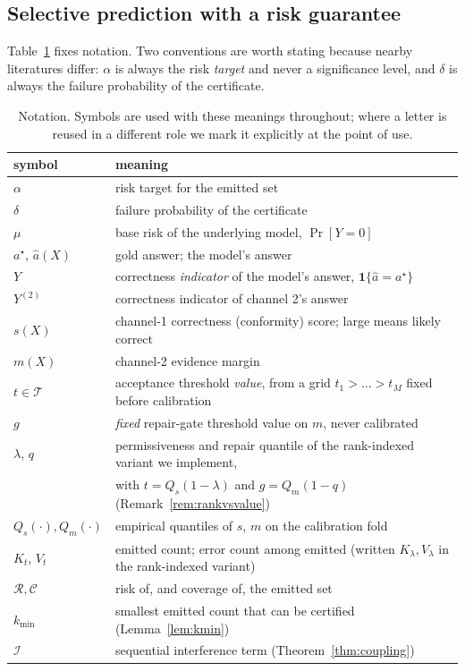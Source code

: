 \documentclass{article}
\theoremstyle{plain}
\theoremstyle{definition}
\theoremstyle{remark}
\newcommand{\Risk}{\mathcal{R}}
\newcommand{\Cov}{\mathcal{C}}
\newcommand{\Iota}{\mathcal{I}}
\begin{document}
\subsection{Selective prediction with a risk guarantee}

Table~\ref{tab:notation} fixes notation. Two conventions are worth stating because nearby
literatures differ: $\alpha$ is always the risk \emph{target} and never a significance
level, and $\delta$ is always the failure probability of the certificate.

\begin{table}[t]
\centering
\caption{Notation. Symbols are used with these meanings throughout; where a letter is
reused in a different role we mark it explicitly at the point of use.}
\label{tab:notation}
\small
\begin{tabular}{ll}
\toprule
symbol & meaning\\
\midrule
$\alpha$ & risk target for the emitted set\\
$\delta$ & failure probability of the certificate\\
$\mu$ & base risk of the underlying model, $\Pr[Y=0]$\\
$a^\star$, $\hat a(X)$ & gold answer; the model's answer\\
$Y$ & correctness \emph{indicator} of the model's answer, $\mathbf{1}\{\hat a=a^\star\}$\\
$Y^{(2)}$ & correctness indicator of channel 2's answer\\
$s(X)$ & channel-1 correctness (conformity) score; large means likely correct\\
$m(X)$ & channel-2 evidence margin\\
$t\in\mathcal{T}$ & acceptance threshold \emph{value}, from a grid $t_1>\dots>t_M$ fixed
before calibration\\
$g$ & \emph{fixed} repair-gate threshold value on $m$, never calibrated\\
$\lambda$, $q$ & permissiveness and repair quantile of the rank-indexed variant we
implement,\\
& with $t=Q_s(1-\lambda)$ and $g=Q_m(1-q)$ (Remark~\ref{rem:rankvsvalue})\\
$Q_s(\cdot),Q_m(\cdot)$ & empirical quantiles of $s$, $m$ on the calibration fold\\
$K_t$, $V_t$ & emitted count; error count among emitted (written $K_\lambda,V_\lambda$
in the rank-indexed variant)\\
$\Risk,\Cov$ & risk of, and coverage of, the emitted set\\
$k_{\min}$ & smallest emitted count that can be certified (Lemma~\ref{lem:kmin})\\
$\Iota$ & sequential interference term (Theorem~\ref{thm:coupling})\\
\bottomrule
\end{tabular}
\end{table}
\end{document}
